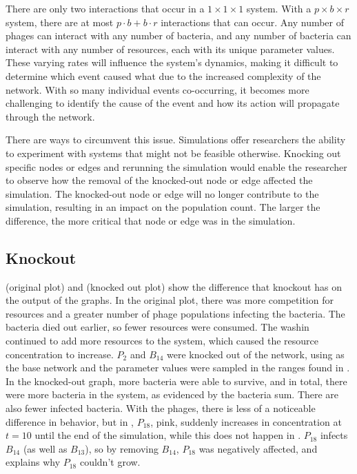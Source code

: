 There are only two interactions that occur in a $1\times1\times1$ system. 
With a $p\times b\times r$ system, there are at most $p\cdot b + b\cdot r$ interactions that can occur. 
Any number of phages can interact with any number of bacteria, and any number of bacteria can interact with any number of resources, each with its unique parameter values. 
These varying rates will influence the system’s dynamics, making it difficult to determine which event caused what due to the increased complexity of the network. 
With so many individual events co-occurring, it becomes more challenging to identify the cause of the event and how its action will propagate through the network. 

There are ways to circumvent this issue. 
Simulations offer researchers the ability to experiment with systems that might not be feasible otherwise. 
Knocking out specific nodes or edges and rerunning the simulation would enable the researcher to observe how the removal of the knocked-out node or edge affected the simulation. 
The knocked-out node or edge will no longer contribute to the simulation, resulting in an impact on the population count. 
The larger the difference, the more critical that node or edge was in the simulation. 

\subsection{Knockout}
 (original plot) and  (knocked out plot) show the difference that knockout has on the output of the graphs. 
In the original plot, there was more competition for resources and a greater number of phage populations infecting the bacteria. 
The bacteria died out earlier, so fewer resources were consumed. 
The washin continued to add more resources to the system, which caused the resource concentration to increase. 
$P_2$ and $B_{14}$ were knocked out of the network, using  as the base network and the parameter values were sampled in the ranges found in . 
In the knocked-out graph, more bacteria were able to survive, and in total, there were more bacteria in the system, as evidenced by the bacteria sum. 
There are also fewer infected bacteria. 
With the phages, there is less of a noticeable difference in behavior, but in , $P_{18}$, pink, suddenly increases in concentration at $t=10$ until the end of the simulation, while this does not happen in . 
$P_{18}$ infects $B_{14}$ (as well as $B_13$), so by removing $B_{14}$, $P_{18}$ was negatively affected, and explains why $P_{18}$ couldn't grow. 

